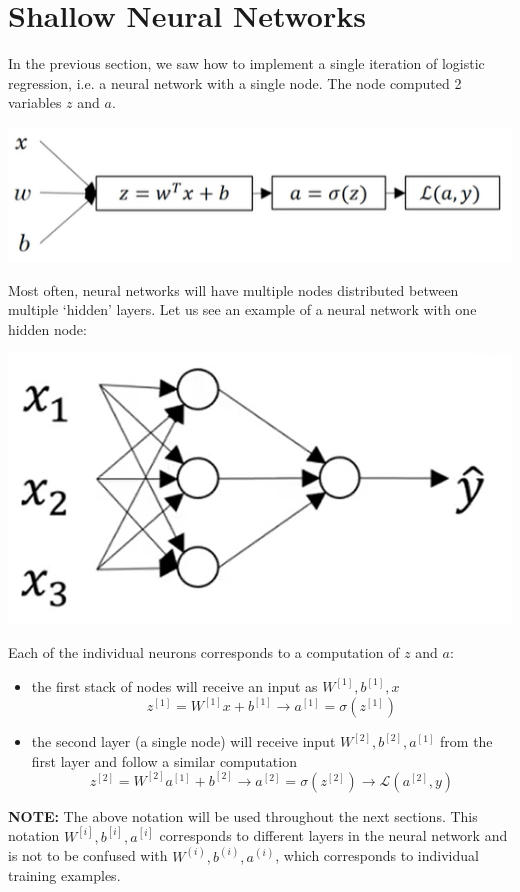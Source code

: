\documentclass{article}[a4paper,12pt]
\theoremstyle{definition}
\newcommand{\Lagr}{\mathcal{L}}
\begin{document}
\section{Shallow Neural Networks}
In the previous section, we saw how to implement a single iteration of logistic regression, i.e. a neural network with a single node. The node computed 2 variables $z$ and $a$.
\begin{center}
\includegraphics{week2.png}
\end{center}
Most often, neural networks will have multiple nodes distributed between multiple `hidden' layers. Let us see an example of a neural network with one hidden node:
\begin{center}
\includegraphics[scale=0.5]{week3.png}
\end{center}
Each of the individual neurons corresponds to a computation of $z$ and $a$:
\begin{itemize}
	\item the first stack of nodes will receive an input as $W^{[1]},b^{[1]},x$$$z^{[1]}=W^{[1]}x+b^{[1]}\longrightarrow a^{[1]}=\sigma(z^{[1]})$$
	\item the second layer (a single node) will receive input $W^{[2]},b^{[2]},a^{[1]}$ from the first layer and follow a similar computation
$$z^{[2]}=W^{[2]}a^{[1]}+b^{[2]}\longrightarrow a^{[2]}=\sigma(z^{[2]})\longrightarrow \Lagr(a^{[2]},y)$$
\end{itemize}
\textbf{NOTE:} The above notation will be used throughout the next sections. This notation $W^{[i]},b^{[i]},a^{[i]}$ corresponds to different layers in the neural network and is not to be confused with $W^{(i)},b^{(i)},a^{(i)}$, which corresponds to individual training examples.
\end{document}
